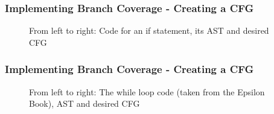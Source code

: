 \begin{frame}
\frametitle{Implementing Branch Coverage - Creating a CFG}

\begin{figure}
\centering
\begin{minipage}{.3\textwidth}
  \centering
  
\end{minipage}%
\begin{minipage}{.3\textwidth}
  \centering
\end{minipage}
\begin{minipage}{.3\textwidth}
  \centering
\end{minipage}
\caption{From left to right: Code for an if statement, its AST and desired CFG}
\label{fig:if}
\end{figure}

\end{frame}

\begin{frame}
\frametitle{Implementing Branch Coverage - Creating a CFG}

\begin{figure}
\centering
\begin{minipage}{.35\textwidth}
  \centering
  
\end{minipage}%
\begin{minipage}{.3\textwidth}
  \centering
\end{minipage}
\begin{minipage}{.24\textwidth}
  \centering
\end{minipage}
\caption{From left to right: The while loop code (taken from the Epsilon Book), AST and desired CFG}
\label{fig:while}
\end{figure}

\end{frame}

